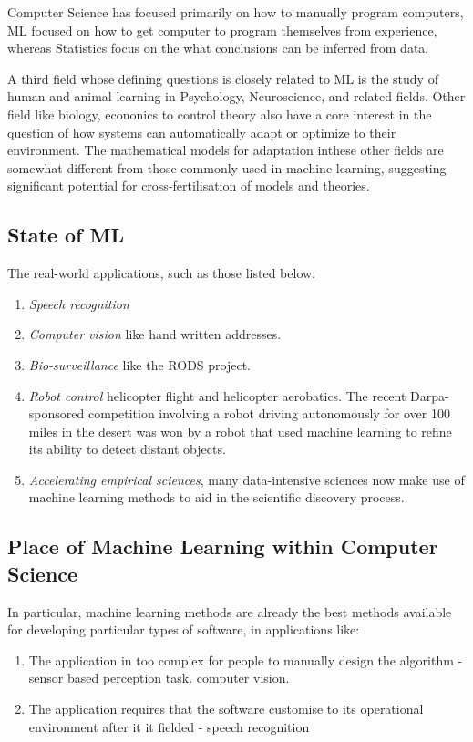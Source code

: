 \documentclass[twoside]{article}
\begin{document}
Computer Science has focused primarily on how to manually program computers, ML focused on how to get computer to program themselves from experience, whereas Statistics focus on the what conclusions can be inferred from data.

A third field whose defining questions is closely related to ML is the study of human and animal learning in Psychology, Neuroscience, and related fields. Other field like biology, econonics to control theory also have a core interest in the question of how systems can automatically adapt or optimize to their environment. The mathematical models for adaptation inthese other fields are somewhat different from those commonly used in machine learning, suggesting significant potential for cross-fertilisation of models and theories.
\subsection{State of ML}
The real-world applications, such as those listed below.
\begin{enumerate}
\item \textit{Speech recognition}
\item \textit{Computer vision} like hand written addresses.
\item \textit{Bio-surveillance} like the RODS project.
\item \textit{Robot control} helicopter flight and helicopter aerobatics. The recent Darpa-sponsored competition involving a robot driving autonomously for over 100 miles in the desert was won by a robot that used machine learning to refine its ability to detect distant objects.
\item \textit{Accelerating empirical sciences}, many data-intensive sciences now make use of machine learning methods to aid in the scientific discovery process.
\end{enumerate}
\subsection{Place of Machine Learning within Computer Science}
In particular, machine learning methods are already the best methods available for developing particular types of software, in applications like:

\begin{enumerate}
\item The application in too complex for people to manually design the algorithm - sensor based perception task. computer vision.
\item The application requires that the software customise to its operational environment after it it fielded - speech recognition 
\end{enumerate}
\end{document}
